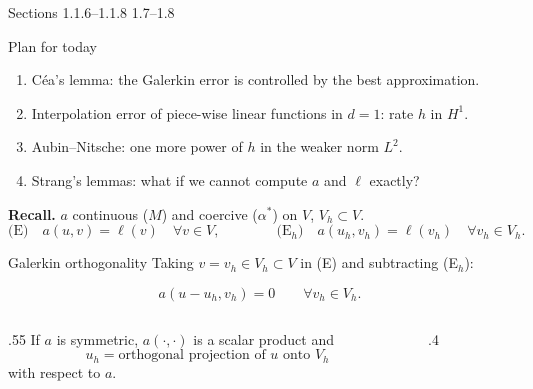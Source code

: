 
{Sections 1.1.6--1.1.8}
{}
{1.7--1.8}

\begin{frame}{Plan for today}
    \begin{enumerate}
        \item Céa's lemma: the Galerkin error is controlled by the best approximation.
        \item Interpolation error of piece-wise linear functions in $d=1$: rate $h$ in $H^1$.
        \item Aubin--Nitsche: one more power of $h$ in the weaker norm $L^2$.
        \item Strang's lemmas: what if we cannot compute $a$ and $\ell$ exactly?
    \end{enumerate}
    \bigskip
    \textbf{Recall.} $a$ continuous ($M$) and coercive ($\alpha^*$) on $V$, $V_h \subset V$.
    \[
        \text{(E)}\quad a(u,v) = \ell(v) \quad \forall v \in V,
        \qquad\qquad
        \text{(E$_h$)}\quad a(u_h,v_h) = \ell(v_h) \quad \forall v_h \in V_h.
    \]
\end{frame}

\begin{frame}{Galerkin orthogonality}
    Taking $v = v_h \in V_h \subset V$ in (E) and subtracting (E$_h$):
    \begin{lemma}
        \[
            a(u - u_h, v_h) = 0 \qquad \forall v_h \in V_h.
        \]
    \end{lemma}
    \bigskip
    \begin{columns}[onlytextwidth]
        \begin{column}{.55\textwidth}
            If $a$ is symmetric, $a(\cdot,\cdot)$ is a scalar product and
            \[
                u_h = \text{orthogonal projection of } u \text{ onto } V_h
            \]
            with respect to $a$.
        \end{column}
        \begin{column}{.4\textwidth}
            \centering
        \end{column}
    \end{columns}
\end{frame}

